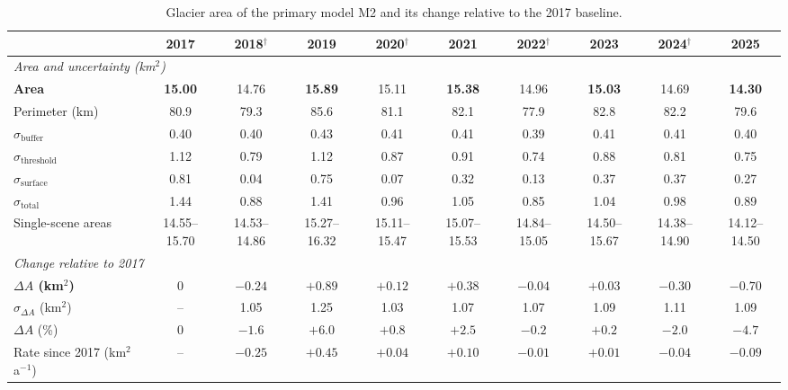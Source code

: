 \documentclass[10pt]{article}
\newcommand{\kmsq}{km$^2$}
\newcommand{\tr}{$^\dagger$}   %
\begin{document}
\begin{table}
\centering\footnotesize
\setlength{\tabcolsep}{3.5pt}
\begin{threeparttable}
\caption{Glacier area of the primary model M2 and its change relative to the 2017 baseline.}
\label{tab:all_m2}
\begin{tabular}{l ccccccccc}
\toprule
 & \textbf{2017} & \textbf{2018}\tr & \textbf{2019} & \textbf{2020}\tr & \textbf{2021} & \textbf{2022}\tr & \textbf{2023} & \textbf{2024}\tr & \textbf{2025} \\
\midrule
\multicolumn{10}{l}{\textit{Area and uncertainty (\kmsq)}} \\
\textbf{Area}                      & \textbf{15.00} & 14.76 & \textbf{15.89} & 15.11 & \textbf{15.38} & 14.96 & \textbf{15.03} & 14.69 & \textbf{14.30} \\
Perimeter (km)                     & 80.9 & 79.3 & 85.6 & 81.1 & 82.1 & 77.9 & 82.8 & 82.2 & 79.6 \\
$\sigma_\mathrm{buffer}$           & 0.40 & 0.40 & 0.43 & 0.41 & 0.41 & 0.39 & 0.41 & 0.41 & 0.40 \\
$\sigma_\mathrm{threshold}$        & 1.12 & 0.79 & 1.12 & 0.87 & 0.91 & 0.74 & 0.88 & 0.81 & 0.75 \\
$\sigma_\mathrm{surface}$          & 0.81 & 0.04 & 0.75 & 0.07 & 0.32 & 0.13 & 0.37 & 0.37 & 0.27 \\
\textbf{$\sigma_\mathrm{total}$}   & 1.44 & 0.88 & 1.41 & 0.96 & 1.05 & 0.85 & 1.04 & 0.98 & 0.89 \\
Single-scene areas                 & 14.55--15.70 & 14.53--14.86 & 15.27--16.32 & 15.11--15.47 & 15.07--15.53 & 14.84--15.05 & 14.50--15.67 & 14.38--14.90 & 14.12--14.50 \\
\midrule
\multicolumn{10}{l}{\textit{Change relative to 2017}} \\
\textbf{$\Delta A$ (\kmsq)}        & 0 & $-0.24$ & $+0.89$ & $+0.12$ & $+0.38$ & $-0.04$ & $+0.03$ & $-0.30$ & $\mathbf{-0.70}$ \\
$\sigma_{\Delta A}$ (\kmsq)        & -- & 1.05 & 1.25 & 1.03 & 1.07 & 1.07 & 1.09 & 1.11 & 1.09 \\
$\Delta A$ (\%)                    & 0 & $-1.6$ & $+6.0$ & $+0.8$ & $+2.5$ & $-0.2$ & $+0.2$ & $-2.0$ & $-4.7$ \\
Rate since 2017 (\kmsq\,a$^{-1}$)  & -- & $-0.25$ & $+0.45$ & $+0.04$ & $+0.10$ & $-0.01$ & $+0.01$ & $-0.04$ & $-0.09$ \\

\end{tabular}
\end{threeparttable}
\end{table}
\end{document}
